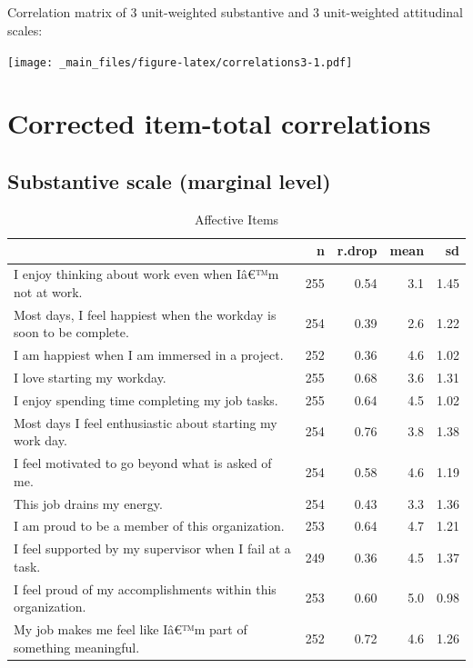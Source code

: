 \documentclass[
]{book}
\begin{document}
\hypertarget{section}{%
\section*{}\label{section}}

Correlation matrix of 3 unit-weighted substantive and 3 unit-weighted attitudinal scales:

\texttt{[image: \_main\_files/figure-latex/correlations3-1.pdf]}

\hypertarget{rdrops}{%
\chapter{Corrected item-total correlations}\label{rdrops}}

\hypertarget{substantive-scale-marginal-level}{%
\section{Substantive scale (marginal level)}\label{substantive-scale-marginal-level}}

\begin{table}

\caption{\label{tab:rdrop1}Affective Items}
\centering
\begin{tabular}[t]{l|r|r|r|r}
\hline
  & n & r.drop & mean & sd\\
\hline
I enjoy thinking about work even when Iâ€™m not at work. & 255 & 0.54 & 3.1 & 1.45\\
\hline
Most days, I feel happiest when the workday is soon to be complete. & 254 & 0.39 & 2.6 & 1.22\\
\hline
I am happiest when I am immersed in a project. & 252 & 0.36 & 4.6 & 1.02\\
\hline
I love starting my workday. & 255 & 0.68 & 3.6 & 1.31\\
\hline
I enjoy spending time completing my job tasks. & 255 & 0.64 & 4.5 & 1.02\\
\hline
Most days I feel enthusiastic about starting my work day. & 254 & 0.76 & 3.8 & 1.38\\
\hline
I feel motivated to go beyond what is asked of me. & 254 & 0.58 & 4.6 & 1.19\\
\hline
This job drains my energy. & 254 & 0.43 & 3.3 & 1.36\\
\hline
I am proud to be a member of this organization. & 253 & 0.64 & 4.7 & 1.21\\
\hline
I feel supported by my supervisor when I fail at a task. & 249 & 0.36 & 4.5 & 1.37\\
\hline
I feel proud of my accomplishments within this organization. & 253 & 0.60 & 5.0 & 0.98\\
\hline
My job makes me feel like Iâ€™m part of something meaningful. & 252 & 0.72 & 4.6 & 1.26\\
\hline
\end{tabular}
\end{table}
\end{document}

